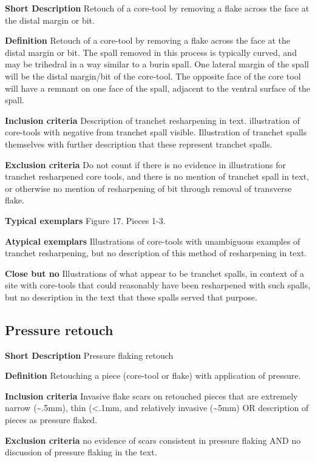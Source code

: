 \documentclass[
]{article}
\begin{document}
\textbf{Short Description} Retouch of a core-tool by removing a flake
across the face at the distal margin or bit.

\textbf{Definition} Retouch of a core-tool by removing a flake across
the face at the distal margin or bit. The spall removed in this process
is typically curved, and may be trihedral in a way similar to a burin
spall. One lateral margin of the spall will be the distal margin/bit of
the core-tool. The opposite face of the core tool will have a remnant on
one face of the spall, adjacent to the ventral surface of the spall.

\textbf{Inclusion criteria} Description of tranchet resharpening in
text. illustration of core-tools with negative from tranchet spall
visible. Illustration of tranchet spalls themselves with further
description that these represent tranchet spalls.

\textbf{Exclusion criteria} Do not count if there is no evidence in
illustrations for tranchet resharpened core tools, and there is no
mention of tranchet spall in text, or otherwise no mention of
resharpening of bit through removal of transverse flake.

\textbf{Typical exemplars} Figure 17. Pieces 1-3.

\textbf{Atypical exemplars} Illustrations of core-tools with unambiguous
examples of tranchet resharpening, but no description of this method of
resharpening in text.

\textbf{Close but no} Illustrations of what appear to be tranchet
spalls, in context of a site with core-tools that could reasonably have
been resharpened with such spalls, but no description in the text that
these spalls served that purpose.

\hypertarget{pressure-retouch}{%
\subsection{Pressure retouch}\label{pressure-retouch}}

\textbf{Short Description} Pressure flaking retouch

\textbf{Definition} Retouching a piece (core-tool or flake) with
application of pressure.

\textbf{Inclusion criteria} Invasive flake scars on retouched pieces
that are extremely narrow (\textasciitilde.5mm), thin (\textless.1mm,
and relatively invasive (\textasciitilde5mm) OR description of pieces as
pressure flaked.

\textbf{Exclusion criteria} no evidence of scars consistent in pressure
flaking AND no discussion of pressure flaking in the text.
\end{document}
